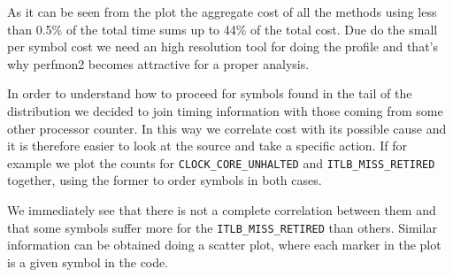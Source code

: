 \documentclass[a4paper]{jpconf}
\begin{document}
As it can be seen from the plot the aggregate cost of all the methods using less than 0.5\% of the total time sums up to 44\% of the total cost. Due do the small per symbol cost we need an high resolution tool for doing the profile and that's why perfmon2 becomes attractive for a proper analysis.


In order to understand how to proceed for symbols found in the tail of the distribution we decided to join timing information with those coming from some other processor counter. In this way we correlate cost with its possible cause and it is therefore easier to look at the source and take a specific action. If for example we plot the counts for \texttt{CLOCK\_CORE\_UNHALTED} and \texttt{ITLB\_MISS\_RETIRED} together, using the former to order symbols in both cases.


\begin{figure}
\caption{}
\label{}
\begin{center}
\end{center}
\end{figure}



We immediately see that there is not a complete correlation between them and that some symbols suffer more for the \texttt{ITLB\_MISS\_RETIRED} than others. Similar information can be obtained doing a scatter plot, where each marker in the plot is a given symbol in the code.
\end{document}
